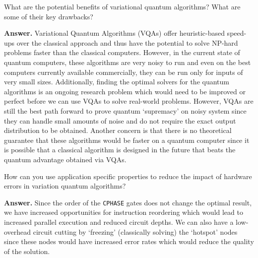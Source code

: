 \begin{question}
    What are the potential benefits of variational quantum algorithms? What are some of their key drawbacks?
\end{question}
\textbf{Answer.} Variational Quantum Algorithms (VQAs) offer heuristic-based speed-ups over the classical approach and thus have the potential to solve NP-hard problems faster than the classical computers. However, in the current state of quantum computers, these algorithms are very noisy to run and even on the best computers currently available commercially, they can be run only for inputs of very small sizes. Additionally, finding the optimal solvers for the quantum algorithms is an ongoing research problem which would need to be improved or perfect before we can use VQAs to solve real-world problems. However, VQAs are still the best path forward to prove quantum `supremacy' on noisy system since they can handle small amounts of noise and do not require the exact output distribution to be obtained. Another concern is that there is no theoretical guarantee that these algorithms would be faster on a quantum computer since it is possible that a classical algorithm is designed in the future that beats the quantum advantage obtained via VQAs.

\tcbline{}

\begin{question}
    How can you use application specific properties to reduce the impact of hardware errors in variation quantum algorithms?
\end{question}
\textbf{Answer.} Since the order of the \texttt{CPHASE} gates does not change the optimal result, we have increased opportunities for instruction reordering which would lead to increased parallel execution and reduced circuit depths. We can also have a low-overhead circuit cutting by `freezing' (classically solving) the `hotspot' nodes since these nodes would have increased error rates which would reduce the quality of the solution.

\tcbline{}

